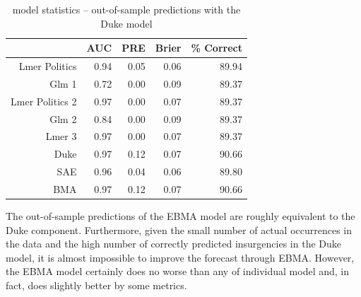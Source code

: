 \documentclass[pdftex,12pt,fullpage,oneside]{amsart}
\begin{document}
\begin{table}[ht]
\begin{center}
\caption{model statistics -- out-of-sample predictions with the
Duke model}
\label{OutSam2}
\begin{tabular}{rrrrr}
  \hline
 & AUC & PRE & Brier & \% Correct \\ 
  \hline
Lmer Politics & 0.94 & 0.05 & 0.06 & 89.94 \\ 
  Glm 1 & 0.72 & 0.00 & 0.09 & 89.37 \\ 
  Lmer Politics 2 & 0.97 & 0.00 & 0.07 & 89.37 \\ 
  Glm 2  & 0.84 & 0.00 & 0.09 & 89.37 \\ 
  Lmer 3 & 0.97 & 0.00 & 0.07 & 89.37 \\ 
  Duke & 0.97 & 0.12 & 0.07 & 90.66 \\ 
  SAE & 0.96 & 0.04 & 0.06 & 89.80 \\ 
  BMA & 0.97 & 0.12 & 0.07 & 90.66 \\ 
   \hline
\end{tabular}
\end{center}
\end{table}

The out-of-sample predictions of the EBMA model are roughly equivalent
to the Duke component. Furthermore, given the small number of actual
occurrences in the data and the high number of correctly predicted
insurgencies in the Duke model, it is almost impossible to improve the
forecast through EBMA.  However, the EBMA model certainly does no worse
than any of individual model and, in fact, does slightly better by
some metrics.
\end{document}
